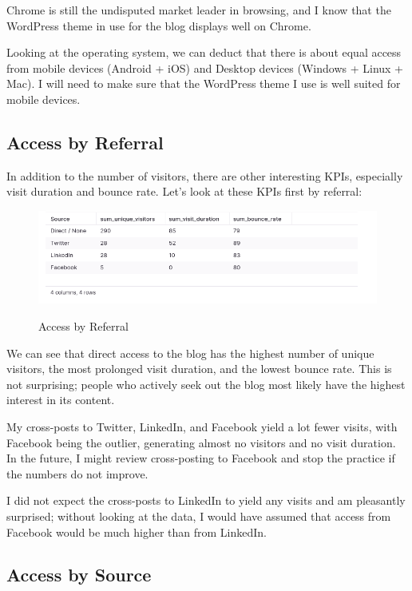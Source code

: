 Chrome is still the undisputed market leader in browsing, and I know that the WordPress theme in use for the blog displays well on Chrome. 

Looking at the operating system, we can deduct that there is about equal access from mobile devices (Android + iOS) and Desktop devices (Windows + Linux + Mac). I will need to make sure that the WordPress theme I use is well suited for mobile devices.

\subsection{Access by Referral}

In addition to the number of visitors, there are other interesting KPIs, especially visit duration and bounce rate. Let's look at these KPIs first by referral:

\begin{figure}[H]
\centering
\caption {Access by Referral}
\includegraphics[width=\linewidth]{images/access-referral.png}
\label{fig:accessReferral}
\end{figure}

We can see that direct access to the blog has the highest number of unique visitors, the most prolonged visit duration, and the lowest bounce rate. This is not surprising; people who actively seek out the blog most likely have the highest interest in its content.

My cross-posts to Twitter, LinkedIn, and Facebook yield a lot fewer visits, with Facebook being the outlier, generating almost no visitors and no visit duration. In the future, I might review cross-posting to Facebook and stop the practice if the numbers do not improve. 

I did not expect the cross-posts to LinkedIn to yield any visits and am pleasantly surprised; without looking at the data, I would have assumed that access from Facebook would be much higher than from LinkedIn.

\subsection{Access by Source}

